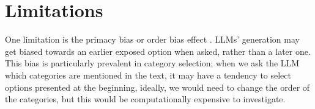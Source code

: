 \documentclass[11pt]{article}
\begin{document}



\section{Limitations}

One limitation is the primacy bias or order bias effect \citep{wang-etal-2023-primacy}. LLMs' generation may get biased towards an earlier exposed option when asked, rather than a later one. This bias is particularly prevalent in category selection; when we ask the LLM which categories are mentioned in the text, it may have a tendency to select options presented at the beginning, ideally, we would need to change the order of the categories, but this would be computationally expensive to investigate.











\end{document}
